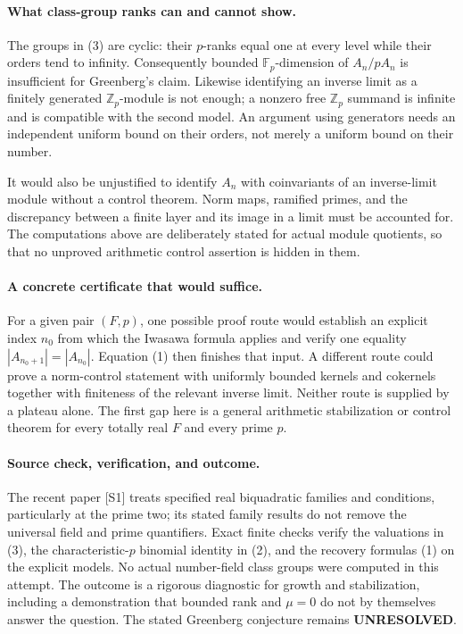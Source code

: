 \documentclass[11pt]{article}
\begin{document}
\paragraph{What class-group ranks can and cannot show.}
The groups in (3) are cyclic: their $p$-ranks equal one at every level
while their orders tend to infinity. Consequently bounded
$\mathbb F_p$-dimension of $A_n/pA_n$ is insufficient for Greenberg's
claim. Likewise identifying an inverse limit as a finitely generated
$\mathbb Z_p$-module is not enough; a nonzero free $\mathbb Z_p$
summand is infinite and is compatible with the second model.
An argument using generators needs an independent uniform bound on
their orders, not merely a uniform bound on their number.

It would also be unjustified to identify $A_n$ with coinvariants of an
inverse-limit module without a control theorem. Norm maps, ramified
primes, and the discrepancy between a finite layer and its image in a
limit must be accounted for. The computations above are deliberately
stated for actual module quotients, so that no unproved arithmetic
control assertion is hidden in them.

\paragraph{A concrete certificate that would suffice.}
For a given pair $(F,p)$, one possible proof route would establish an
explicit index $n_0$ from which the Iwasawa formula applies and verify
one equality $|A_{n_0+1}|=|A_{n_0}|$. Equation (1) then finishes that
input. A different route could prove a norm-control statement with
uniformly bounded kernels and cokernels together with finiteness of
the relevant inverse limit. Neither route is supplied by a plateau
alone. The first gap here is a general arithmetic stabilization or
control theorem for every totally real $F$ and every prime $p$.

\paragraph{Source check, verification, and outcome.}
The recent paper [S1] treats specified real biquadratic families and
conditions, particularly at the prime two; its stated family results
do not remove the universal field and prime quantifiers. Exact finite
checks verify the valuations in (3), the characteristic-$p$ binomial
identity in (2), and the recovery formulas (1) on the explicit models.
No actual number-field class groups were computed in this attempt.
The outcome is a rigorous diagnostic for growth and stabilization,
including a demonstration that bounded rank and $\mu=0$ do not by
themselves answer the question. The stated Greenberg conjecture remains
\textbf{UNRESOLVED}.
\end{document}
